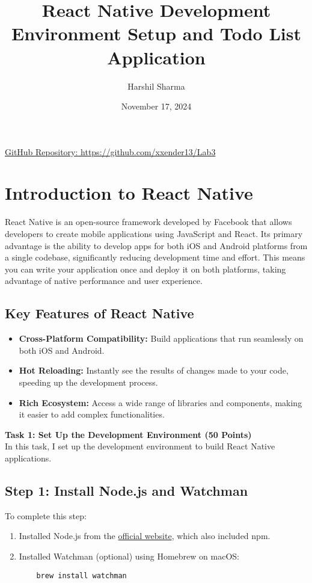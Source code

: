 \documentclass{article}
\title{React Native Development Environment Setup and Todo List Application}
\author{Harshil Sharma}
\date{November 17, 2024}
\begin{document}
\maketitle

\begin{center}
\href{https://github.com/xxender13/Lab3}{GitHub Repository: https://github.com/xxender13/Lab3}
\end{center}

\section{Introduction to React Native}
React Native is an open-source framework developed by Facebook that allows developers to create mobile applications using JavaScript and React. Its primary advantage is the ability to develop apps for both iOS and Android platforms from a single codebase, significantly reducing development time and effort. This means you can write your application once and deploy it on both platforms, taking advantage of native performance and user experience.

\subsection{Key Features of React Native}
\begin{itemize}
    \item \textbf{Cross-Platform Compatibility:} Build applications that run seamlessly on both iOS and Android.
    \item \textbf{Hot Reloading:} Instantly see the results of changes made to your code, speeding up the development process.
    \item \textbf{Rich Ecosystem:} Access a wide range of libraries and components, making it easier to add complex functionalities.
\end{itemize}


\noindent\textbf{\Large Task 1: Set Up the Development Environment (50 Points)}\\[0.5cm]
\noindent In this task, I set up the development environment to build React Native applications.\\[1cm]

\subsection{Step 1: Install Node.js and Watchman}
To complete this step:
\begin{enumerate}
    \item Installed Node.js from the \href{https://nodejs.org/en}{official website}, which also included npm.
    \item Installed Watchman (optional) using Homebrew on macOS:
    \begin{verbatim}
    brew install watchman
    \end{verbatim}
\end{enumerate}
\end{document}
